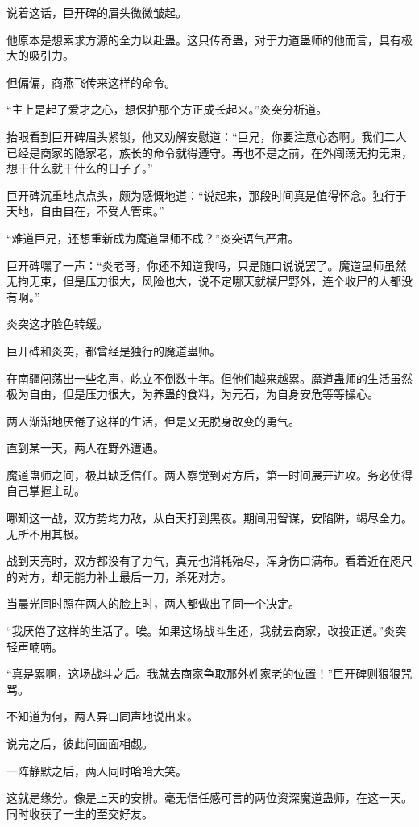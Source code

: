 \begin{this_body}
说着这话，巨开碑的眉头微微皱起。

他原本是想索求方源的全力以赴蛊。这只传奇蛊，对于力道蛊师的他而言，具有极大的吸引力。

但偏偏，商燕飞传来这样的命令。

“主上是起了爱才之心，想保护那个方正成长起来。”炎突分析道。

抬眼看到巨开碑眉头紧锁，他又劝解安慰道：“巨兄，你要注意心态啊。我们二人已经是商家的隐家老，族长的命令就得遵守。再也不是之前，在外闯荡无拘无束，想干什么就干什么的日子了。”

巨开碑沉重地点点头，颇为感慨地道：“说起来，那段时间真是值得怀念。独行于天地，自由自在，不受人管束。”

“难道巨兄，还想重新成为魔道蛊师不成？”炎突语气严肃。

巨开碑嘿了一声：“炎老哥，你还不知道我吗，只是随口说说罢了。魔道蛊师虽然无拘无束，但是压力很大，风险也大，说不定哪天就横尸野外，连个收尸的人都没有啊。”

炎突这才脸色转缓。

巨开碑和炎突，都曾经是独行的魔道蛊师。

在南疆闯荡出一些名声，屹立不倒数十年。但他们越来越累。魔道蛊师的生活虽然极为自由，但是压力很大，为养蛊的食料，为元石，为自身安危等等操心。

两人渐渐地厌倦了这样的生活，但是又无脱身改变的勇气。

直到某一天，两人在野外遭遇。

魔道蛊师之间，极其缺乏信任。两人察觉到对方后，第一时间展开进攻。务必使得自己掌握主动。

哪知这一战，双方势均力敌，从白天打到黑夜。期间用智谋，安陷阱，竭尽全力。无所不用其极。

战到天亮时，双方都没有了力气，真元也消耗殆尽，浑身伤口满布。看着近在咫尺的对方，却无能力补上最后一刀，杀死对方。

当晨光同时照在两人的脸上时，两人都做出了同一个决定。

“我厌倦了这样的生活了。唉。如果这场战斗生还，我就去商家，改投正道。”炎突轻声喃喃。

“真是累啊，这场战斗之后。我就去商家争取那外姓家老的位置！”巨开碑则狠狠咒骂。

不知道为何，两人异口同声地说出来。

说完之后，彼此间面面相觑。

一阵静默之后，两人同时哈哈大笑。

这就是缘分。像是上天的安排。毫无信任感可言的两位资深魔道蛊师，在这一天。同时收获了一生的至交好友。


\end{this_body}

